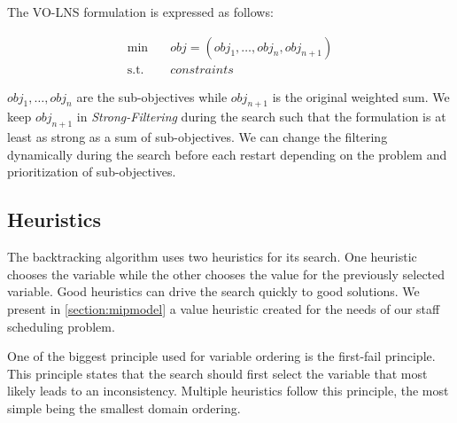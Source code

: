 \documentclass[../../thesis.tex]{subfiles}
\begin{document}
The VO-LNS formulation is expressed as follows:

\begin{align*}
  \text{min} \quad & obj = (obj_1, \dots, obj_n, obj_{n+1}) \\
  \text{s.t.} \quad & constraints 
\end{align*}

$obj_1, \dots, obj_n$ are the sub-objectives while $obj_{n+1}$ is the original weighted sum. We keep $obj_{n+1}$ in 
\emph{Strong-Filtering} during the search such that the formulation is at least as strong as a sum of sub-objectives.
We can change the filtering dynamically during the search before each restart depending on the problem and prioritization of sub-objectives.

\subsection{Heuristics}

The backtracking algorithm uses two heuristics for its search. One heuristic chooses the variable while the other chooses 
the value for the previously selected variable. Good heuristics can drive the search quickly to good solutions. 
We present in \autoref{section:mipmodel} a value heuristic created for the needs of our staff scheduling problem.


One of the biggest principle used for variable ordering is the first-fail principle. 
This principle states that the search should first select the variable that most likely leads to 
an inconsistency. Multiple heuristics follow this principle, the most simple being the smallest domain ordering.


\end{document}
